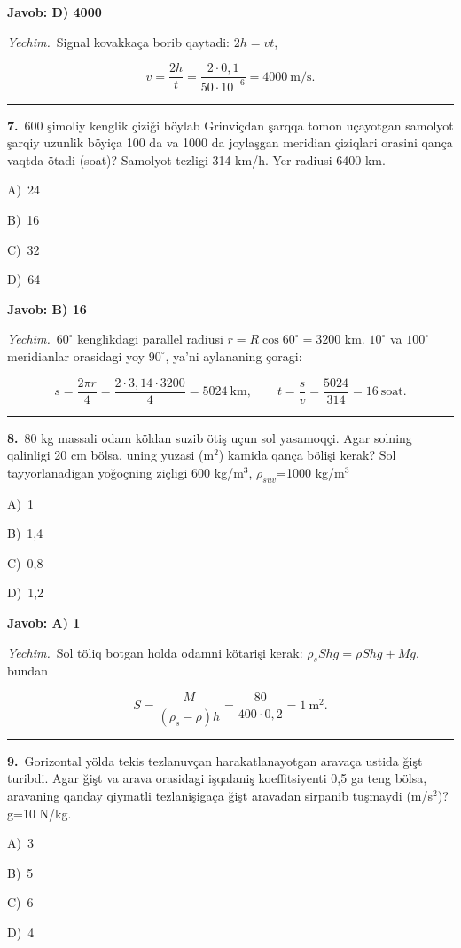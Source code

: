 \documentclass[11pt,a4paper]{article}
\newcommand{\opt}[2]{\hspace*{4mm}#1)\ #2\par}
\begin{document}
\noindent\colorbox{gray!12}{\parbox{\dimexpr\linewidth-2\fboxsep}{\textbf{Javob: D) 4000}}}\par\smallskip
\noindent\textit{Yechim.}\ Signal kovakkaça borib qaytadi: $2h=vt$,\par
\[v=\frac{2h}{t}=\frac{2\cdot0{,}1}{50\cdot10^{-6}}=4000\ \text{m/s}.\]\par\medskip\hrule\medskip
{}\noindent\begin{minipage}{\linewidth}
\textbf{7.}\ 600 şimoliy kenglik çiziği böylab Grinviçdan şarqqa tomon uçayotgan samolyot şarqiy uzunlik böyiça 100 da va 1000 da joylaşgan meridian çiziqlari orasini qança vaqtda ötadi (soat)? Samolyot tezligi 314 km/h. Yer radiusi 6400 km.\par\smallskip
\opt{A}{24}
\opt{B}{16}
\opt{C}{32}
\opt{D}{64}
\end{minipage}\vspace{2pt}\par
\noindent\colorbox{gray!12}{\parbox{\dimexpr\linewidth-2\fboxsep}{\textbf{Javob: B) 16}}}\par\smallskip
\noindent\textit{Yechim.}\ $60^\circ$ kenglikdagi parallel radiusi $r=R\cos60^\circ=3200$ km. $10^\circ$ va $100^\circ$ meridianlar orasidagi yoy $90^\circ$, ya’ni aylananing çoragi:\par
\[s=\frac{2\pi r}{4}=\frac{2\cdot3{,}14\cdot3200}{4}=5024\ \text{km},\qquad t=\frac{s}{v}=\frac{5024}{314}=16\ \text{soat}.\]\par\medskip\hrule\medskip
{}\noindent\begin{minipage}{\linewidth}
\textbf{8.}\ 80 kg massali odam köldan suzib ötiş uçun sol yasamoqçi. Agar solning qalinligi 20 cm bölsa, uning yuzasi (m$^{2}$) kamida qança bölişi kerak? Sol tayyorlanadigan yoğoçning ziçligi 600 kg/m$^{3}$, $\rho_{suv}$=1000 kg/m$^{3}$\par\smallskip
\opt{A}{1}
\opt{B}{1,4}
\opt{C}{0,8}
\opt{D}{1,2}
\end{minipage}\vspace{2pt}\par
\noindent\colorbox{gray!12}{\parbox{\dimexpr\linewidth-2\fboxsep}{\textbf{Javob: A) 1}}}\par\smallskip
\noindent\textit{Yechim.}\ Sol töliq botgan holda odamni kötarişi kerak: $\rho_s Shg=\rho Shg+Mg$, bundan\par
\[S=\frac{M}{(\rho_s-\rho)h}=\frac{80}{400\cdot0{,}2}=1\ \text{m}^2.\]\par\medskip\hrule\medskip
{}\noindent\begin{minipage}{\linewidth}
\textbf{9.}\ Gorizontal yölda tekis tezlanuvçan harakatlanayotgan aravaça ustida ğişt turibdi. Agar ğişt va arava orasidagi işqalaniş koeffitsiyenti 0,5 ga teng bölsa, aravaning qanday qiymatli tezlanişigaça ğişt aravadan sirpanib tuşmaydi (m/s$^{2}$)? g=10 N/kg.\par\smallskip
\opt{A}{3}
\opt{B}{5}
\opt{C}{6}
\opt{D}{4}
\end{minipage}\vspace{2pt}\par
\end{document}
